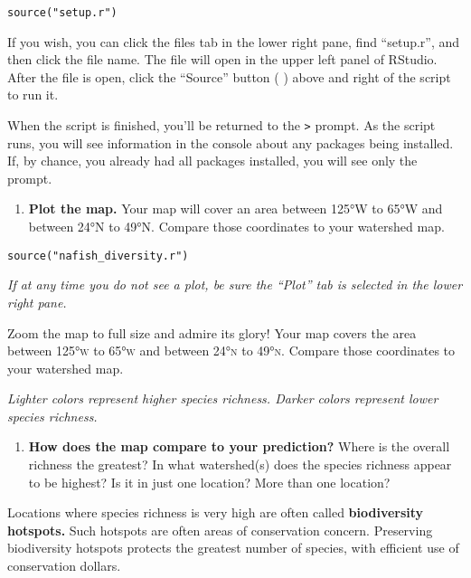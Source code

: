 \documentclass[11pt]{article}
\begin{document}
\begin{verbatim}
source("setup.r")
\end{verbatim}

If you wish, you can click the files tab in the lower right pane, find “setup.r”, and then click the file name. The file will open in the upper left panel of RStudio. After the file is open, click the “Source” button  (\,\,) above and right of the script to run it.


When the script is finished, you'll be returned to the \texttt{>} prompt. As the script runs, you will see information in the console about any packages being installed. If, by chance, you already had all packages installed, you will see only the prompt.

\begin{enumerate}[resume]
\item \textbf{Plot the map.} Your map will cover
an area between 125°W to 65°W and between 24°N to 49°N. Compare those
coordinates to your watershed map.
\end{enumerate}


\begin{verbatim}
source("nafish_diversity.r") 
\end{verbatim}

\textit{If at any time you do not see a plot, be sure the “Plot” tab is selected in the lower right pane.}

Zoom the map to full size and admire its glory! Your map covers
the area between 125°\textsc{w} to 65°\textsc{w} and between 24°\textsc{n} to 49°\textsc{n.} Compare those
coordinates to your watershed map. 

\textit{Lighter colors represent higher species richness. Darker colors represent lower species richness.}


\begin{enumerate}[resume]
\item \textbf{How does the map compare to your prediction?} Where is the overall
richness the greatest? In what watershed(s) does the species richness appear to be highest? Is it in just one location? More than one location?\vspace{10\baselineskip}
\end{enumerate}

Locations where species richness is very high are often called
\textbf{biodiversity hotspots.} Such hotspots are often areas of conservation
concern. Preserving biodiversity hotspots protects the greatest number
of species, with efficient use of conservation dollars.
\end{document}
